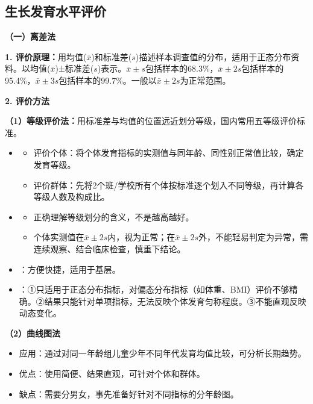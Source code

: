 \subsection{生长发育水平评价}

\begin{keybox}
\textbf{（一）离差法}

\textbf{1. 评价原理：}用均值($\bar{x}$)和标准差($s$)描述样本调查值的分布，适用于正态分布资料。以均值($\bar{x}$)±标准差($s$)表示。$\bar{x}\pm s$包括样本的68.3\%，$\bar{x}\pm 2s$包括样本的95.4\%，$\bar{x}\pm 3s$包括样本的99.7\%。一般以$\bar{x}\pm 2s$为正常范围。

\textbf{2. 评价方法}

\textbf{（1）等级评价法：}用标准差与均值的位置远近划分等级，国内常用五等级评价标准。

\begin{itemize}[leftmargin=*]
    \item {}
    \begin{itemize}
        \item 评价个体：将个体发育指标的实测值与同年龄、同性别正常值比较，确定发育等级。
        \item 评价群体：先将2个班/学校所有个体按标准逐个划入不同等级，再计算各等级人数及构成比。
    \end{itemize}
    \item {}
    \begin{itemize}
        \item 正确理解等级划分的含义，不是越高越好。
        \item 个体实测值在$\bar{x}\pm 2s$内，视为正常；在$\bar{x}\pm 2s$外，不能轻易判定为异常，需连续观察、结合临床检查，慎重下结论。
    \end{itemize}
    \item {}：方便快捷，适用于基层。
    \item {}：①只适用于正态分布指标，对偏态分布指标（如体重、BMI）评价不够精确。②结果只能针对单项指标，无法反映个体发育匀称程度。③不能直观反映动态变化。
\end{itemize}

\textbf{（2）曲线图法}

\begin{itemize}[leftmargin=*]
    \item 应用：通过对同一年龄组儿童少年不同年代发育均值比较，可分析长期趋势。
    \item 优点：使用简便、结果直观，可针对个体和群体。
    \item 缺点：需要分男女，事先准备好针对不同指标的分年龄图。
\end{itemize}


\end{keybox}
